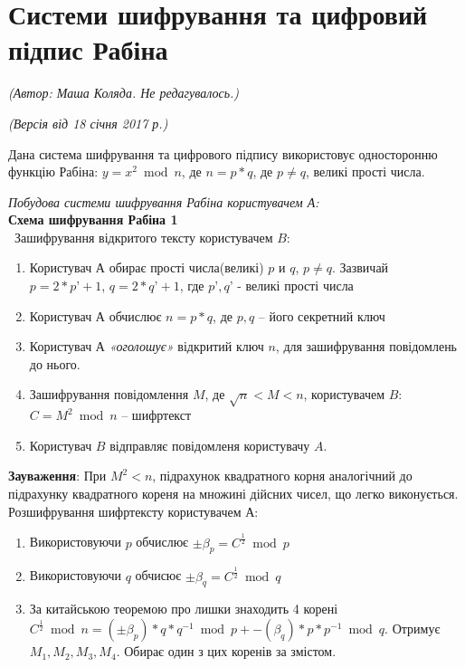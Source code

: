 \section{Системи шифрування та цифровий підпис Рабіна}
\begin{flushright}
\emph{(Автор: Маша Коляда. Не редагувалось.)}
\par \emph{(Версія від 18 січня 2017 р.)}
\end{flushright}

Дана система шифрування та цифрового підпису використовує односторонню функцію Рабіна: $y=x^2 \bmod n$, де $n=p*q$, де  $p\ne q$, великі прості числа.

\textit{Побудова системи шифрування Рабіна користувачем А:}\\
\textbf{Схема шифрування Рабіна 1}\\
\ Зашифрування відкритого тексту користувачем $B$:
\begin{enumerate}
        \item Користувач А обирає прості числа(великі) $p$ и $q$, $p\ne q$. Зазвичай $p=2*p’+1$,  $q=2*q’+1$, где  $p’, q’$ - великі прості числа
        \item Користувач А обчислює $n=p*q$, де  $p,q$ – його секретний ключ
        \item Користувач А \textit{«оголошує»} відкритий ключ $n$, для зашифрування повідомлень до нього.
        \item Зашифрування повідомлення $M$, де $\sqrt{n}<M<n$,  користувачем $B$: $ C=M^2 \bmod n$ – шифртекст 
        \item Користувач $B$ відправляє повідомленя користувачу $A$.    
\end{enumerate}
\textbf{Зауваження}:  При $M^2<n$, підрахунок квадратного корня аналогічний до підрахунку квадратного кореня на множині дійсних чисел, що легко виконується.\\
Розшифрування шифртексту користувачем  А:
\begin{enumerate}
        \item   Використовуючи $p$ обчислює $\pm \beta_p=C^{\frac{1}{2}}\bmod p$
        \item Використовуючи $q$ обчисює $\pm \beta_q=C^{\frac{1}{2}}\bmod q$
        \item За китайською теоремою про лишки знаходить 4 корені $C^{\frac{1}{2}}\bmod n={(\pm \beta_p)*q*q^{-1}\bmod p +-( \beta_q)*p*p^{-1}\bmod q}$. Отримує  ${M_1,M_2,M_3,M_4}$.
        Обирає один з цих коренів за змістом.   
\end{enumerate}
